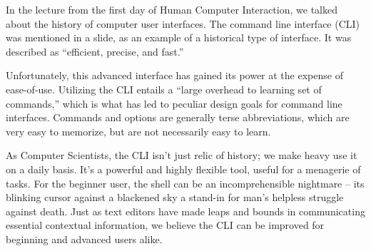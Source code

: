 In the lecture from the first day of Human Computer Interaction, we talked about
the history of computer user interfaces. The command line interface (CLI) was
mentioned in a slide, as an example of a historical type of interface. It was
described as ``efficient, precise, and fast.''

Unfortunately, this advanced interface has gained its power at the expense of
ease-of-use. Utilizing the CLI entails a “large overhead to learning set of
commands,” which is what has led to peculiar design goals for command line
interfaces. Commands and options are generally terse abbreviations, which are
very easy to memorize, but are not necessarily easy to learn.

As Computer Scientists, the CLI isn’t just relic of history; we make heavy use
it on a daily basis. It’s a powerful and highly flexible tool, useful for a
menagerie of tasks. For the beginner user, the shell can be an incomprehensible
nightmare \--- its blinking cursor against a blackened sky a stand-in for man's
helpless struggle against death. Just as text editors have made leaps and bounds
in communicating essential contextual information, we believe the CLI can be
improved for beginning and advanced users alike.
